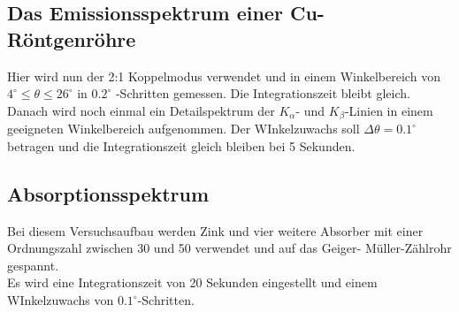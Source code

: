 \subsection{Das Emissionsspektrum einer Cu-Röntgenröhre}

Hier wird nun der 2:1 Koppelmodus verwendet und in einem Winkelbereich
von $ 4 ^\circ \leq \theta \leq 26 ^\circ$ in $0.2 ^\circ$
-Schritten gemessen. Die Integrationszeit bleibt gleich.\\
Danach wird noch einmal ein Detailspektrum der $K_{\alpha}$- und $K_{\beta}$-Linien
in einem geeigneten Winkelbereich aufgenommen. Der WInkelzuwachs soll $\Delta \theta = 0.1 ^\circ$
betragen und die Integrationszeit gleich bleiben bei 5 Sekunden.\\

\subsection{Absorptionsspektrum}

Bei diesem Versuchsaufbau werden Zink und vier weitere Absorber
mit einer Ordnungszahl zwischen 30 und 50 verwendet und auf das Geiger-
Müller-Zählrohr gespannt.\\
Es wird eine Integrationszeit von 20 Sekunden eingestellt und einem WInkelzuwachs
von $0.1 ^\circ$-Schritten.
